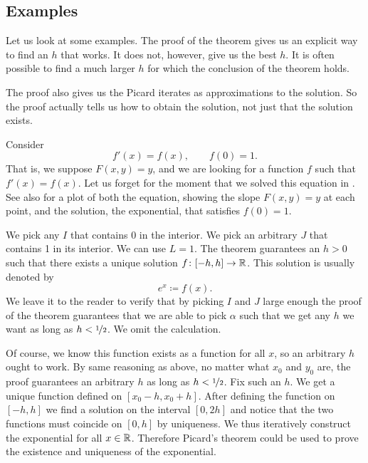 \subsection{Examples}

Let us look at some examples.  The proof of the theorem 
gives us an explicit way to find an $h$ that works.  It does not, however, give
us the best $h$.  It is often possible to find a much larger $h$ for
which the conclusion of the theorem holds.

The proof also gives us the Picard iterates as approximations to the
solution.  So the proof actually tells us how to obtain
the solution, not just that the solution exists.

\begin{example} \label{example:picardexponential}
Consider
\begin{equation*}
f'(x) = f(x), \qquad f(0) = 1 .
\end{equation*}
That is, we suppose $F(x,y) = y$, and we are looking for a function 
$f$ such that $f'(x) = f(x)$.
Let us forget for the moment that we solved this equation in 
.  See also  for a plot of
both the equation, showing
the slope $F(x,y)=y$ at each point, and the solution,
the exponential, that satisfies $f(0)=1$.

We pick any $I$ that contains 0
in the interior.
We pick an arbitrary $J$ that contains 1 in its interior.  We can
use $L = 1$.
The theorem guarantees an $h > 0$ such that
there exists a unique solution $f \colon [-h,h] \to {\mathbb{R}}$.  This solution
is usually denoted by
\begin{equation*}
e^x \coloneqq f(x) .
\end{equation*}
We leave it to the reader to verify that by picking $I$ and $J$
large enough the proof of the theorem guarantees that
we are able to pick $\alpha$ such that we get any
$h$ we want as long as $h < \nicefrac{1}{2}$.  We omit the calculation.

Of course, we know %
this function exists
as a function for all $x$, so an arbitrary $h$ ought to work.
By same reasoning as above,
no matter what $x_0$ and $y_0$ are,
the proof guarantees an arbitrary $h$ as long as $h < \nicefrac{1}{2}$.
Fix such an $h$.
We get a unique function defined on $[x_0-h,x_0+h]$.  After defining the
function on $[-h,h]$ we find a solution on the interval $[0,2h]$
and notice that the two functions must coincide on $[0,h]$ by uniqueness.
We thus iteratively construct the exponential for all $x \in {\mathbb{R}}$.
Therefore Picard's theorem could be used to prove the existence and uniqueness
of the exponential.


\end{example}
